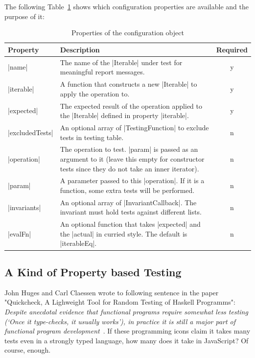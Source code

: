 The following Table~\ref{tab:testing_table} shows which configuration 
properties are available and the purpose of it:


\begin{table}[H]
  \center
  \begin{tabular}{ l m{10cm} c}
    \textbf{Property} & \textbf{Description} & \textbf{Required}\\
    \hline
    |name|            & The name of the |Iterable| under test for meaningful 
                      report messages. 
                    & y 
                    \\ 
    |iterable|        & A function that constructs a new |Iterable| to apply the 
                      operation to. 
                    & y 
                    \\  
    |expected|        & The expected result of the operation applied to the |Iterable|
                      defined in property |iterable|.
                    & 
                    y  \\ 
    |excludedTests|   & An optional array of |TestingFunction| to exclude tests
                      in testing table. 
                    & n 
                    \\
    |operation|       & The operation to test. |param| is passed as an argument
                      to it
                     (leave this empty for constructor 
                      tests since they do not take an inner iterator). 
                    & n 
                    \\
    |param|           & A parameter passed to this |operation|. If it is a
                      function, some extra tests will be performed. 
                    & n
                    \\ 
    |invariants|      & An optional array of |InvariantCallback|. The invariant 
                      must hold tests against different lists. 
                    & n
                    \\
    |evalFn|          & An optional function that takes |expected| and the |actual| 
                      in curried style. The default is |iterableEq|.
                    & n 
                    \\
  \end{tabular}
  \caption{Properties of the configuration object}
\label{tab:testing_table}
\end{table}


\subsection{A Kind of Property based Testing}
\label{sub:A Kind of Property based Testing}
John Huges and Carl Claessen wrote to following sentence in the paper
"Quickcheck, A Lighweight Tool for Random Testing of Haskell Programms":
\textit{
Despite anecdotal evidence that functional programs require somewhat less
testing (`Once it type-checks, it usually works'), in practice it is still a 
major part of functional program development}~\cite{quickcheck_hughes}.
If these programming icons claim it takes many tests even in a strongly typed 
language, how many does it take in JavaScript? Of course, enough.

